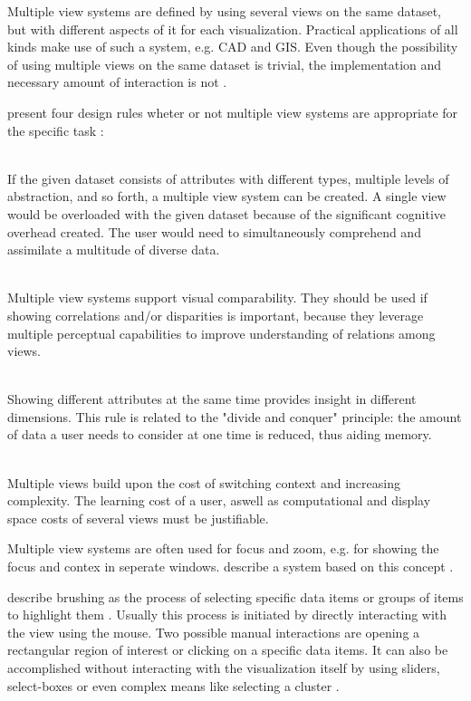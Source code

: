 Multiple view systems are defined by using several views on the same dataset, but with different aspects of it for each visualization. Practical applications of all kinds make use of such a system, e.g. \ac{CAD} and \ac{GIS}. Even though the possibility of using multiple views on the same dataset is trivial, the implementation and necessary amount of interaction is not .

\citeauthor{Baldonado2000} present four design rules wheter or not multiple view systems are appropriate for the specific task :

\begin{enumerate}

 \hfill \\
If the given dataset consists of attributes with different types, multiple levels of abstraction, and so forth, a multiple view system can be created. A single view would be overloaded with the given dataset because of the significant cognitive overhead created. The user would need to simultaneously comprehend and assimilate a multitude of diverse data.

 \hfill \\
Multiple view systems support visual comparability. They should be used if showing correlations and/or disparities is important, because they leverage multiple perceptual capabilities to improve understanding of relations among views.

 \hfill \\
Showing different attributes at the same time provides insight in different dimensions. This rule is related to the "divide and conquer" principle: the amount of data a user needs to consider at one time is reduced, thus aiding memory.

 \hfill \\
Multiple views build upon the cost of switching context and increasing complexity. The learning cost of a user, aswell as computational and display space costs of several views must be justifiable.

\end{enumerate}

Multiple view systems are often used for focus and zoom, e.g. for showing the focus and contex in seperate windows. \citeauthor{Robert:1998} describe a system based on this concept .

\citeauthor{Martin:1995} describe brushing as the process of selecting specific data items or groups of items to highlight them . Usually this process is initiated by directly interacting with the view using the mouse. Two possible manual interactions are opening a rectangular region of interest or clicking on a specific data items. It can also be accomplished without interacting with the visualization itself by using sliders, select-boxes or even complex means like selecting a cluster .


